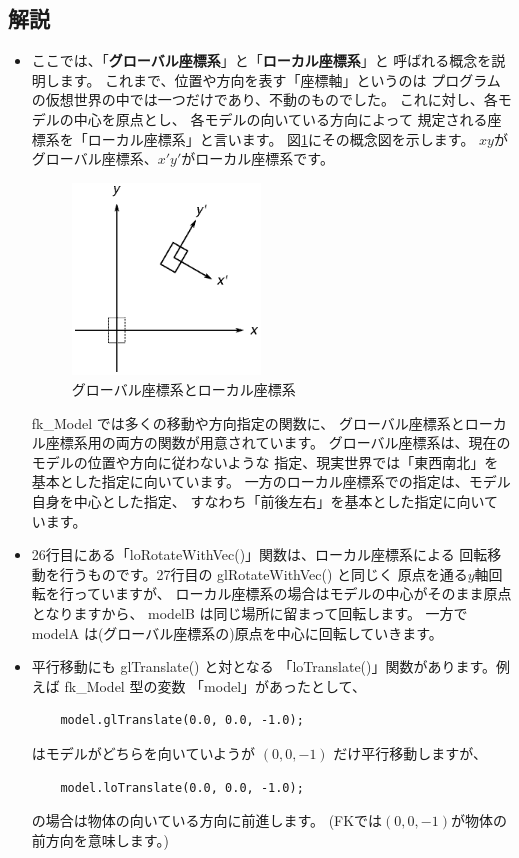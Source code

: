 \subsection*{解説}
\begin{itemize}
 \item ここでは、「\textbf{グローバル座標系}」と「\textbf{ローカル座標系}」と
	呼ばれる概念を説明します。
	これまで、位置や方向を表す「座標軸」というのは
	プログラムの仮想世界の中では一つだけであり、不動のものでした。
	これに対し、各モデルの中心を原点とし、
	各モデルの向いている方向によって
	規定される座標系を「ローカル座標系」と言います。
	図\ref{Fig:06-Local}にその概念図を示します。
	\(xy\)がグローバル座標系、\(x'y'\)がローカル座標系です。
	\begin{figure}[H]
	\centering
	\includegraphics[width=5cm]{./Fig/Fig06-01.eps}
	\caption{グローバル座標系とローカル座標系}
	\label{Fig:06-Local}
	\end{figure}
	fk\_Model では多くの移動や方向指定の関数に、
	グローバル座標系とローカル座標系用の両方の関数が用意されています。
	グローバル座標系は、現在のモデルの位置や方向に従わないような
	指定、現実世界では「東西南北」を基本とした指定に向いています。
	一方のローカル座標系での指定は、モデル自身を中心とした指定、
	すなわち「前後左右」を基本とした指定に向いています。

\item 26行目にある「loRotateWithVec()」関数は、ローカル座標系による
	回転移動を行うものです。27行目の glRotateWithVec() と同じく
	原点を通る\(y\)軸回転を行っていますが、
	ローカル座標系の場合はモデルの中心がそのまま原点となりますから、
	modelB は同じ場所に留まって回転します。
	一方で modelA は(グローバル座標系の)原点を中心に回転していきます。

\item 平行移動にも glTranslate() と対となる
	「loTranslate()」関数があります。例えば fk\_Model 型の変数
	「model」があったとして、
	\begin{screen}
	\begin{verbatim}
	model.glTranslate(0.0, 0.0, -1.0);
	\end{verbatim}
	\end{screen}
	はモデルがどちらを向いていようが \((0, 0, -1)\) だけ平行移動しますが、
	\begin{screen}
	\begin{verbatim}
	model.loTranslate(0.0, 0.0, -1.0);
	\end{verbatim}
	\end{screen}
	の場合は物体の向いている方向に前進します。
	(FKでは\((0, 0, -1)\)が物体の前方向を意味します。)
	
\end{itemize}

